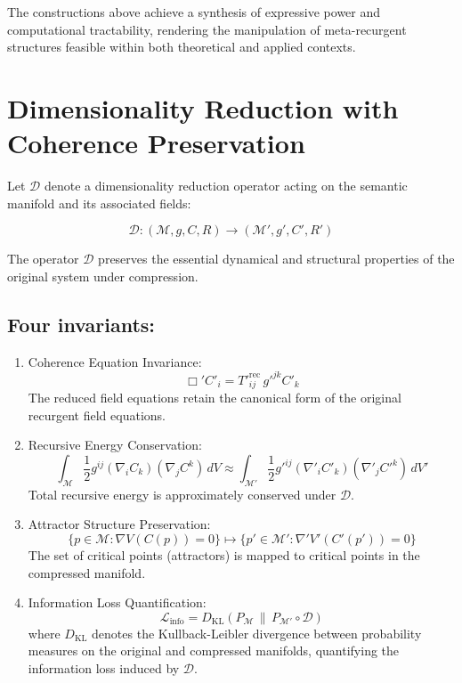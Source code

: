 The constructions above achieve a synthesis of expressive power and computational tractability, rendering the manipulation of meta-recurgent structures feasible within both theoretical and applied contexts.

\section{Dimensionality Reduction with Coherence Preservation}

Let \(\mathcal{D}\) denote a dimensionality reduction operator acting on the semantic manifold and its associated fields:

\begin{equation}
\mathcal{D}: (\mathcal{M}, g, C, R) \longrightarrow (\mathcal{M}', g', C', R')
\end{equation}

The operator \(\mathcal{D}\) preserves the essential dynamical and structural properties of the original system under compression.

\subsection{Four invariants:}

\begin{enumerate}
    \item Coherence Equation Invariance:
    \begin{equation}
    \Box' C'_i = {T'}^{\mathrm{rec}}_{ij} \, {g'}^{jk} C'_k
    \end{equation}
    The reduced field equations retain the canonical form of the original recurgent field equations.

    \item Recursive Energy Conservation:
    \begin{equation}
    \int_{\mathcal{M}} \frac{1}{2} g^{ij} (\nabla_i C_k)(\nabla_j C^k) \, dV \approx \int_{\mathcal{M}'} \frac{1}{2} {g'}^{ij} (\nabla'_i C'_k)(\nabla'_j {C'}^k) \, dV'
    \end{equation}
    Total recursive energy is approximately conserved under \(\mathcal{D}\).

    \item Attractor Structure Preservation:
    \begin{equation}
    \{p \in \mathcal{M} : \nabla V(C(p)) = 0\} \longmapsto \{p' \in \mathcal{M}' : \nabla' V'(C'(p')) = 0\}
    \end{equation}
    The set of critical points (attractors) is mapped to critical points in the compressed manifold.

    \item Information Loss Quantification:
    \begin{equation}
    \mathcal{L}_{\mathrm{info}} = D_{\mathrm{KL}}(P_{\mathcal{M}} \,\|\, P_{\mathcal{M}'} \circ \mathcal{D})
    \end{equation}
    where \(D_{\mathrm{KL}}\) denotes the Kullback-Leibler divergence between probability measures on the original and compressed manifolds, quantifying the information loss induced by \(\mathcal{D}\).
\end{enumerate}

